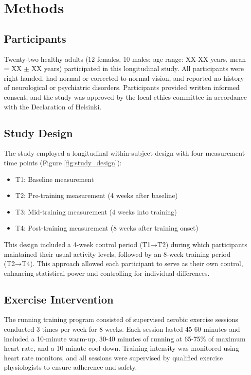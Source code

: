 \documentclass[12pt,a4paper]{article}
\begin{document}
\section{Methods}

\subsection{Participants}

Twenty-two healthy adults (12 females, 10 males; age range: XX-XX years, mean = XX $\pm$ XX years) participated in this longitudinal study. All participants were right-handed, had normal or corrected-to-normal vision, and reported no history of neurological or psychiatric disorders. Participants provided written informed consent, and the study was approved by the local ethics committee in accordance with the Declaration of Helsinki.

\subsection{Study Design}

The study employed a longitudinal within-subject design with four measurement time points (Figure \ref{fig:study_design}):
\begin{itemize}
    \item T1: Baseline measurement
    \item T2: Pre-training measurement (4 weeks after baseline)
    \item T3: Mid-training measurement (4 weeks into training)
    \item T4: Post-training measurement (8 weeks after training onset)
\end{itemize}

This design included a 4-week control period (T1→T2) during which participants maintained their usual activity levels, followed by an 8-week training period (T2→T4). This approach allowed each participant to serve as their own control, enhancing statistical power and controlling for individual differences.

\subsection{Exercise Intervention}

The running training program consisted of supervised aerobic exercise sessions conducted 3 times per week for 8 weeks. Each session lasted 45-60 minutes and included a 10-minute warm-up, 30-40 minutes of running at 65-75\% of maximum heart rate, and a 10-minute cool-down. Training intensity was monitored using heart rate monitors, and all sessions were supervised by qualified exercise physiologists to ensure adherence and safety.
\end{document}
